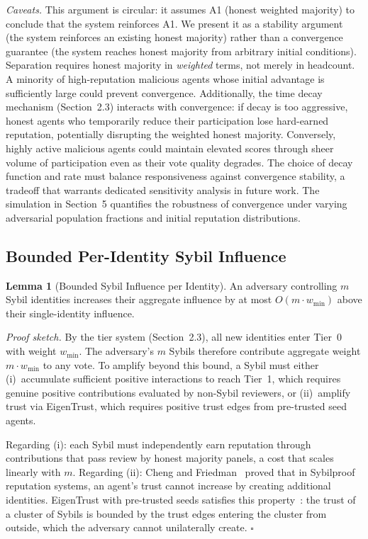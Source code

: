 \documentclass[11pt]{article}
\begin{document}
\textit{Caveats.} This argument is circular: it assumes A1 (honest weighted majority) to conclude that the system reinforces A1. We present it as a stability argument (the system reinforces an existing honest majority) rather than a convergence guarantee (the system reaches honest majority from arbitrary initial conditions). Separation requires honest majority in \textit{weighted} terms, not merely in headcount. A minority of high-reputation malicious agents whose initial advantage is sufficiently large could prevent convergence. Additionally, the time decay mechanism (Section~2.3) interacts with convergence: if decay is too aggressive, honest agents who temporarily reduce their participation lose hard-earned reputation, potentially disrupting the weighted honest majority. Conversely, highly active malicious agents could maintain elevated scores through sheer volume of participation even as their vote quality degrades. The choice of decay function and rate must balance responsiveness against convergence stability, a tradeoff that warrants dedicated sensitivity analysis in future work. The simulation in Section~5 quantifies the robustness of convergence under varying adversarial population fractions and initial reputation distributions.

\subsection{Bounded Per-Identity Sybil Influence}

\textbf{Lemma 1} (Bounded Sybil Influence per Identity). An adversary controlling $m$ Sybil identities increases their aggregate influence by at most $O(m \cdot w_{\min})$ above their single-identity influence.

\textit{Proof sketch.} By the tier system (Section~2.3), all new identities enter Tier~0 with weight $w_{\min}$. The adversary's $m$ Sybils therefore contribute aggregate weight $m \cdot w_{\min}$ to any vote. To amplify beyond this bound, a Sybil must either (i)~accumulate sufficient positive interactions to reach Tier~1, which requires genuine positive contributions evaluated by non-Sybil reviewers, or (ii)~amplify trust via EigenTrust, which requires positive trust edges from pre-trusted seed agents.

Regarding (i): each Sybil must independently earn reputation through contributions that pass review by honest majority panels, a cost that scales linearly with $m$. Regarding (ii): Cheng and Friedman~\cite{cheng2005} proved that in Sybilproof reputation systems, an agent's trust cannot increase by creating additional identities. EigenTrust with pre-trusted seeds satisfies this property~\cite{kamvar2003, cao2012}: the trust of a cluster of Sybils is bounded by the trust edges entering the cluster from outside, which the adversary cannot unilaterally create. $\square$
\end{document}
